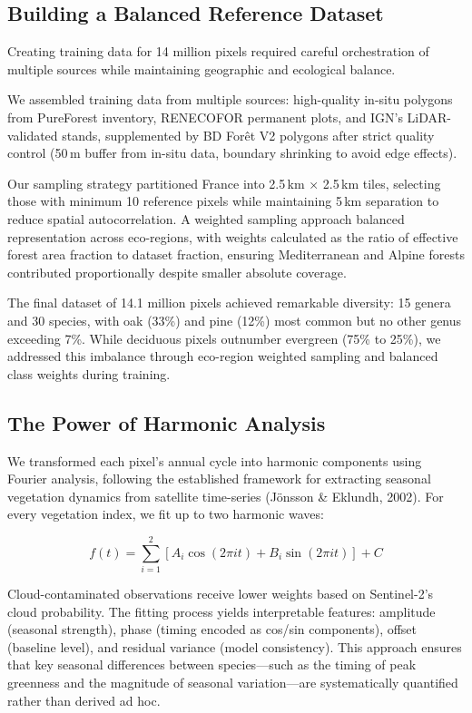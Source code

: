 \documentclass[utf8]{FrontiersinHarvard}
\begin{document}
\subsection{Building a Balanced Reference Dataset}

Creating training data for 14 million pixels required careful orchestration of multiple sources while maintaining geographic and ecological balance.

We assembled training data from multiple sources: high-quality in-situ polygons from PureForest inventory, RENECOFOR permanent plots, and IGN's LiDAR-validated stands, supplemented by BD Forêt V2 polygons after strict quality control (50\,m buffer from in-situ data, boundary shrinking to avoid edge effects).

Our sampling strategy partitioned France into 2.5\,km × 2.5\,km tiles, selecting those with minimum 10 reference pixels while maintaining 5\,km separation to reduce spatial autocorrelation. A weighted sampling approach balanced representation across eco-regions, with weights calculated as the ratio of effective forest area fraction to dataset fraction, ensuring Mediterranean and Alpine forests contributed proportionally despite smaller absolute coverage.

The final dataset of 14.1 million pixels achieved remarkable diversity: 15 genera and 30 species, with oak (33\%) and pine (12\%) most common but no other genus exceeding 7\%. While deciduous pixels outnumber evergreen (75\% to 25\%), we addressed this imbalance through eco-region weighted sampling and balanced class weights during training.

\subsection{The Power of Harmonic Analysis}

We transformed each pixel's annual cycle into harmonic components using Fourier analysis, following the established framework for extracting seasonal vegetation dynamics from satellite time-series (Jönsson \& Eklundh, 2002). For every vegetation index, we fit up to two harmonic waves:

$$ f(t) = \sum_{i=1}^{2} \left[ A_i \cos(2\pi i t) + B_i \sin(2\pi i t) \right] + C $$

Cloud-contaminated observations receive lower weights based on Sentinel-2's cloud probability. The fitting process yields interpretable features: amplitude (seasonal strength), phase (timing encoded as cos/sin components), offset (baseline level), and residual variance (model consistency). This approach ensures that key seasonal differences between species—such as the timing of peak greenness and the magnitude of seasonal variation—are systematically quantified rather than derived ad hoc.
\end{document}
